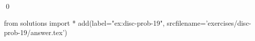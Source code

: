 
\begin{ex} 
  \label{ex:disc-prob-19}
  
  \qed
\end{ex} 
\begin{python0}
from solutions import *
add(label="ex:disc-prob-19",
    srcfilename='exercises/disc-prob-19/answer.tex') 
\end{python0}
